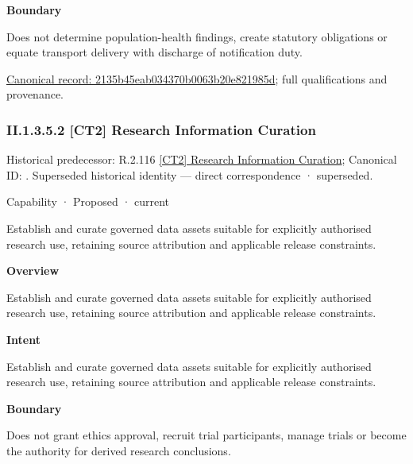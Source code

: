 \textbf{Boundary}



Does not determine population-health findings, create statutory obligations or equate transport delivery with discharge of notification duty.


{\footnotesize \href{../../../../../../../continuum/strategy/capability/2135b45eab034370b0063b20e821985d.md}{Canonical record: 2135b45eab034370b0063b20e821985d}; full qualifications and provenance.}\par
\subsubsection*{II.1.3.5.2 [CT2] Research Information Curation}
\label{navigation:II.1.3.5.2}

{\small Historical predecessor: R.2.116 \hyperref[element:11203b9c80964a9b96883eeab07f41d5]{[CT2] Research Information Curation}; Canonical ID: \texttt{}. Superseded historical identity — direct correspondence · superseded.}\par
\label{element:4f5b8cec90324c2989cdc30e80bc8cb9}
{\small Capability · Proposed · current}\par

Establish and curate governed data assets suitable for explicitly authorised research use, retaining source attribution and applicable release constraints.



\textbf{Overview}



Establish and curate governed data assets suitable for explicitly authorised research use, retaining source attribution and applicable release constraints.



\textbf{Intent}



Establish and curate governed data assets suitable for explicitly authorised research use, retaining source attribution and applicable release constraints.



\textbf{Boundary}



Does not grant ethics approval, recruit trial participants, manage trials or become the authority for derived research conclusions.


